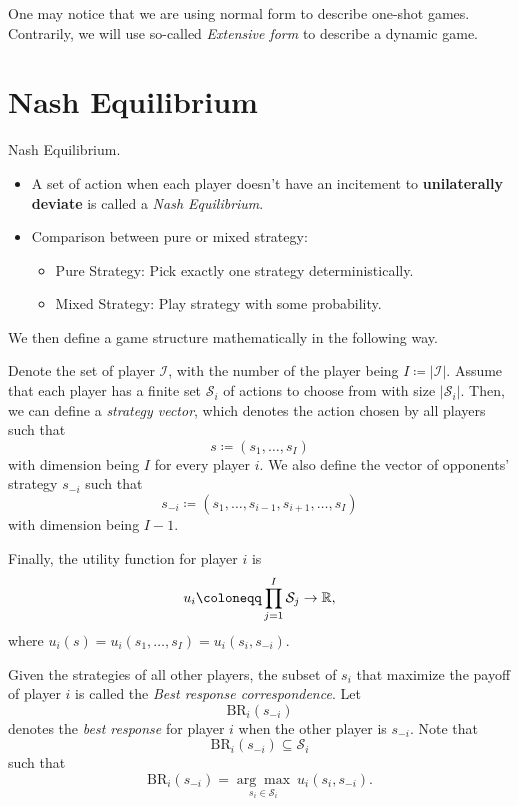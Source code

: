 \begin{note}
	One may notice that we are using normal form to describe one-shot games. Contrarily, we will use so-called \emph{Extensive form} to describe a
	dynamic game.
\end{note}

\section{Nash Equilibrium}
\begin{definition}
	Nash Equilibrium.
	\begin{itemize}
		\item A set of action when each player doesn't have an incitement to \textbf{unilaterally deviate} is called a \emph{Nash Equilibrium}.
		\item Comparison between pure or mixed strategy:
		      \begin{itemize}
			      \item Pure Strategy: Pick exactly one strategy deterministically.
			      \item Mixed Strategy: Play strategy with some probability.
		      \end{itemize}
	\end{itemize}
\end{definition}

We then define a game structure mathematically in the following way.
\begin{definition}
	Denote the set of player \(\mathcal{I}\), with the number of the player being \(I\coloneqq \left\vert \mathcal{I} \right\vert \).
	Assume that each player has a finite set \(\mathcal{S}_i\) of actions to choose from with size \(\left\vert \mathcal{S}_i \right\vert \).
	Then, we can define a \emph{strategy vector}, which denotes the action chosen by all players such that
	\[
		s\coloneqq (s_1, \ldots , s_I)
	\]
	with dimension being \(I\) for every player \(i\). We also define the vector of opponents' strategy \(s_{-i}\) such that
	\[
		s_{-i}\coloneqq (s_1,\ldots,s_{i - 1},s_{i + 1} ,\ldots,s_I)
	\]
	with dimension being \(I - 1\).

	Finally, the utility function for player \(i\) is
	\[
		u_{i} \coloneqq \prod\limits_{j = 1}^{I} \mathcal{S}_j \to \mathbb{\MakeUppercase{R}},
	\]
	where \(u_{i}(s) = u_{i}(s_1, \ldots , s_I) = u_{i}(s_{i}, s_{-i})\).
\end{definition}

\begin{definition}
	Given the strategies of all other players, the subset of \(s_{i}\) that maximize the payoff of player \(i\) is called the \emph{Best response correspondence}.
	Let
	\[
		\mathrm{BR}_i(s_{-i})
	\]
	denotes the \emph{best response} for player \(i\) when the other player is \(s_{-i}\). Note that
	\[
		\mathrm{BR}_i(s_{-i}) \subseteq \mathcal{S}_i
	\]
	such that
	\[
		\mathrm{BR}_i(s_{-i})= \underset{s_{i}\in\mathcal{S}_i}{\arg\max}\ u_{i}(s_{i}, s_{-i}).
	\]
\end{definition}
